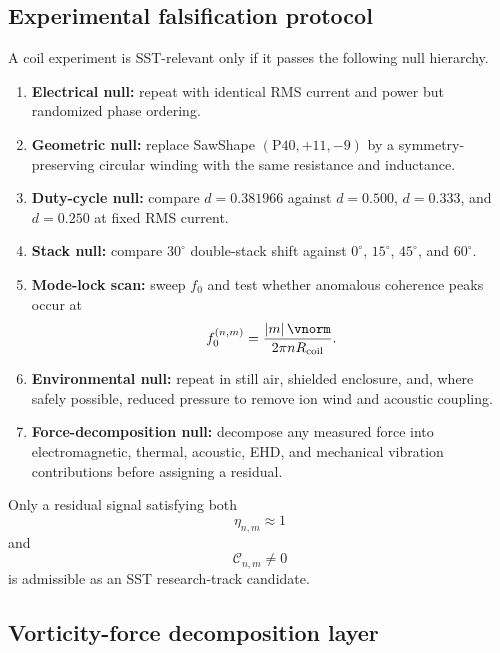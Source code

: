 \subsection{Experimental falsification protocol}

A coil experiment is SST-relevant only if it passes the following null hierarchy.

\begin{enumerate}
\item \textbf{Electrical null:} repeat with identical RMS current and power but randomized phase ordering.
\item \textbf{Geometric null:} replace SawShape $(\mathrm{P40},+11,-9)$ by a symmetry-preserving circular winding with the same resistance and inductance.
\item \textbf{Duty-cycle null:} compare $d=0.381966$ against $d=0.500$, $d=0.333$, and $d=0.250$ at fixed RMS current.
\item \textbf{Stack null:} compare $30^\circ$ double-stack shift against $0^\circ$, $15^\circ$, $45^\circ$, and $60^\circ$.
\item \textbf{Mode-lock scan:} sweep $f_0$ and test whether anomalous coherence peaks occur at
\[
f_0^{(n,m)}
=
\frac{|m|\,\vnorm}{2\pi n R_{\mathrm{coil}}}.
\]
\item \textbf{Environmental null:} repeat in still air, shielded enclosure, and, where safely possible, reduced pressure to remove ion wind and acoustic coupling.
\item \textbf{Force-decomposition null:} decompose any measured force into electromagnetic, thermal, acoustic, EHD, and mechanical vibration contributions before assigning a residual.
\end{enumerate}

Only a residual signal satisfying both
\begin{equation}
\eta_{n,m}\approx 1
\end{equation}
and
\begin{equation}
\mathcal{C}_{n,m}\neq 0
\end{equation}
is admissible as an SST research-track candidate.

\subsection{Vorticity-force decomposition layer}

